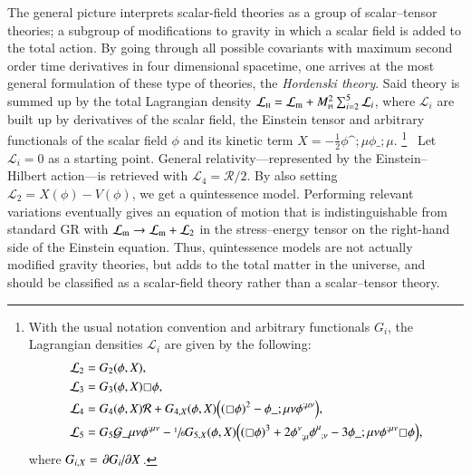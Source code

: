 









The general picture interprets scalar-field theories as a group of scalar--tensor theories; a subgroup of modifications to gravity in which a scalar field is added to the total action. By going through all possible covariants with maximum second order time derivatives in four dimensional spacetime, one arrives at the most general formulation of these type of theories, the \emph{Hordenski theory}. Said theory is summed up by the total Lagrangian density $\mathcal{L}_{\text{\tiny{H}}} = \mathcal{L}_\mathrm{m} + M_{\text{\tiny{Pl}}}^2 \sum_{i=2}^{5} \mathcal{L}_i$, where $\mathcal{L}_i$ are built up by derivatives of the scalar field, the Einstein tensor and arbitrary functionals of the scalar field $\phi$ and its kinetic term $X = - \frac{1}{2} \phi\^{;\mu}\phi\_{;\mu}$.%
\footnote{%
With the usual notation convention and arbitrary functionals $G_i$, the Lagrangian densities $\mathcal{L}_i$ are given by the following:
\begin{equation*}
    \begin{split}
        \mathcal{L}_2 &= G_2(\phi, X), \\
        \mathcal{L}_3 &= G_3 (\phi, X)\sq \phi, \\
        \mathcal{L}_4 &= G_4 (\phi, X)\mathcal{R} + G_{4,X}(\phi, X) \pclosed{ {(\sq \phi)}^2 - \phi\_{;\mu\nu} \phi\^{;\mu\nu}}, \\
        \mathcal{L}_5 &= G_5 \mathcal{G}\_{\mu\nu}\phi\^{;\mu\nu} - \sfrac{1}{6} G_{5,X}(\phi, X)  \pclosed{ {(\sq \phi)}^3 + 
        2\phi\indices{^\nu_{;\mu}}\phi\indices{^\mu_{;\nu}} - 3  \phi\_{;\mu\nu} \phi\^{;\mu\nu} \sq \phi},
    \end{split}
\end{equation*}%
where $G_{i,X}= \pdv*{G_i}{X}$.
}~%
Let $\mathcal{L}_i=0$ as a starting point. %
General relativity---represented by the Einstein--Hilbert action---is retrieved with $\mathcal{L}_4 = \mathcal{R}/2$.  By also setting $\mathcal{L}_2 = X(\phi)-V(\phi)$, we get a quintessence model. Performing relevant variations eventually gives an equation of motion that is indistinguishable from standard GR with $\mathcal{L}_\mathrm{m} \to \mathcal{L}_\mathrm{m} + \mathcal{L}_2$ in the stress--energy tensor on the right-hand side of the Einstein equation. Thus, quintessence models are not actually modified gravity theories, but adds to the total matter in the universe, and should be classified as a scalar-field theory rather than a scalar--tensor theory. %






